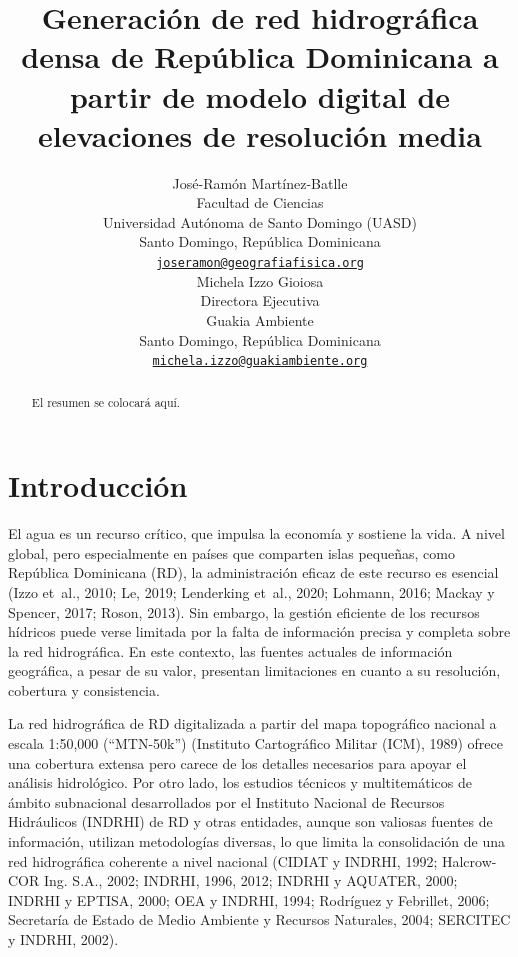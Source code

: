 \documentclass[spanish]{article}
\title{Generación de red hidrográfica densa de República Dominicana a
partir de modelo digital de elevaciones de resolución media}
\author{
    José-Ramón Martínez-Batlle\orcidlink{0000-0001-9924-0327}
   \\
    Facultad de Ciencias \\
    Universidad Autónoma de Santo Domingo (UASD) \\
  Santo Domingo, República Dominicana \\
  \texttt{\href{mailto:joseramon@geografiafisica.org}{\nolinkurl{joseramon@geografiafisica.org}}} \\
   \And
    Michela Izzo Gioiosa\orcidlink{0000-0003-4835-3967}
   \\
    Directora Ejecutiva \\
    Guakia Ambiente \\
  Santo Domingo, República Dominicana \\
  \texttt{\href{mailto:michela.izzo@guakiambiente.org}{\nolinkurl{michela.izzo@guakiambiente.org}}} \\
  }
\begin{document}
\maketitle


\begin{abstract}
El resumen se colocará aquí.
\end{abstract}


\hypertarget{introducciuxf3n}{%
\section{Introducción}\label{introducciuxf3n}}

El agua es un recurso crítico, que impulsa la economía y sostiene la
vida. A nivel global, pero especialmente en países que comparten islas
pequeñas, como República Dominicana (RD), la administración eficaz de
este recurso es esencial (Izzo et~al., 2010; Le, 2019; Lenderking
et~al., 2020; Lohmann, 2016; Mackay y Spencer, 2017; Roson, 2013). Sin
embargo, la gestión eficiente de los recursos hídricos puede verse
limitada por la falta de información precisa y completa sobre la red
hidrográfica. En este contexto, las fuentes actuales de información
geográfica, a pesar de su valor, presentan limitaciones en cuanto a su
resolución, cobertura y consistencia.

La red hidrográfica de RD digitalizada a partir del mapa topográfico
nacional a escala 1:50,000 (``MTN-50k'') (Instituto Cartográfico Militar
(ICM), 1989) ofrece una cobertura extensa pero carece de los detalles
necesarios para apoyar el análisis hidrológico. Por otro lado, los
estudios técnicos y multitemáticos de ámbito subnacional desarrollados
por el Instituto Nacional de Recursos Hidráulicos (INDRHI) de RD y otras
entidades, aunque son valiosas fuentes de información, utilizan
metodologías diversas, lo que limita la consolidación de una red
hidrográfica coherente a nivel nacional (CIDIAT y INDRHI, 1992;
Halcrow-COR Ing. S.A., 2002; INDRHI, 1996, 2012; INDRHI y AQUATER, 2000;
INDRHI y EPTISA, 2000; OEA y INDRHI, 1994; Rodríguez y Febrillet, 2006;
Secretaría de Estado de Medio Ambiente y Recursos Naturales, 2004;
SERCITEC y INDRHI, 2002).
\end{document}
